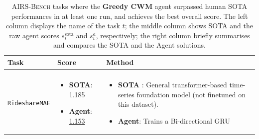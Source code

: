 \documentclass{fairmeta}
\newcommand{\airsbench}{\textsc{AIRS-Bench}}
\begin{document}
\begin{table}[htbp]
\centering
\footnotesize
\begin{tabularx}{\textwidth}{p{} p{} X}
\toprule
\rowcolor{faintgreen}
\textbf{Task} & \textbf{Score} & \textbf{Method} \\
\midrule
\makecell[l]{\texttt{TimeSeriesForecasting-}\\\texttt{RideshareMAE}} &
\begin{itemize}[nosep,leftmargin=*]
    \item \textbf{SOTA}: 1.185
    \item \textbf{Agent}: \underline{1.153}
\end{itemize} &
\begin{itemize}[nosep,leftmargin=*]
    \item \textbf{SOTA} \citep{gong2025bridging}: General transformer-based time-series foundation model (not finetuned on this dataset).
    \item \textbf{Agent}: Trains a Bi-directional GRU
\end{itemize} \\
\bottomrule
\end{tabularx}
\caption{\airsbench{} tasks where the \textbf{Greedy CWM} agent surpassed human SOTA performances in at least one run, and achieves the best overall score. The left column displays the name of the task $t$; the middle column shows SOTA and the raw agent scores $s^\mathrm{sota}_t$ and $s_t^a$, respectively; the right column briefly summarises and compares the SOTA and the Agent solutions.}
\label{tab:beat-sota-greedycwm}

\end{table}








\end{document}
